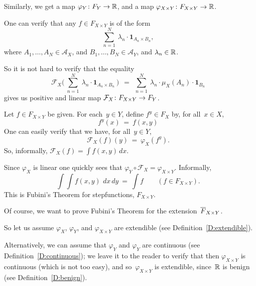 \documentclass[main.tex]{subfiles}
\begin{document}
Similarly, we get
a map $\varphi_Y \colon F_Y \rightarrow \mathbb{R}$,
and a map $\varphi_{X\times Y} \colon F_{X\times Y} \rightarrow \mathbb{R}$.

One can verify that any $f\in F_{X\times Y}$
is of the form
\begin{equation*}
\textstyle{\sum_{n=1}^N} \ \lambda_n \cdot\mathbf{1}_{A_n \times B_n},
\end{equation*}
where $A_1,\dotsc,A_N\in \mathcal{A}_X$,
and $B_1,\dotsc,B_N\in\mathcal{A}_Y$,
and $\lambda_n \in \mathbb{R}$.

So it is not hard to verify that the  equality
\begin{equation*}
\mathcal{F}_X \bigl(\ 
\textstyle{\sum_{n=1}^N} \ \lambda_n \cdot\mathbf{1}_{A_n \times B_n}\ \bigr)
\ \ =\ \ 
\textstyle{\sum_{n=1}^N} \ \lambda_n \cdot \mu_X(A_n) \cdot \mathbf{1}_{B_n}
\end{equation*}
gives us positive and linear map 
$\mathcal{F}_X \colon F_{X\times Y} \rightarrow F_Y$.

Let $f\in F_{X\times Y}$ be given.
For each~$y\in Y$,
define $f^y\in F_X$ by, for all~$x\in X$,
\begin{equation*}
f^y(x) \ =\  f(x,y)
\end{equation*}
One can easily verify that we have, for all~$y\in Y$,
\begin{equation*}
\mathcal{F}_X (f) (y)\ =\ \varphi_X (f^y).
\end{equation*}
So, informally, $\mathcal{F}_{X}(f) = \int f(x,y)\,dx$.

Since $\varphi_X$ is linear
one quickly sees that $\varphi_Y \circ \mathcal{F}_X = \varphi_{X\times Y}$.
Informally,
\begin{equation*}
\int\int f(x,y)\, \,dx \,dy
\ =\ 
\int f
\qquad(f\in F_{X\times Y}).
\end{equation*}
This is Fubini's Theorem for stepfunctions, $F_{X\times Y}$.

Of course, we want to prove
Fubini's Theorem
for the extension~$\overline{F}_{X\times Y}$.

So let us assume
$\varphi_X$, $\varphi_Y$, and $\varphi_{X\times Y}$ are extendible
(see Definition~\ref{D:extendible}).

Alternatively,
we can assume that 
$\varphi_Y$ and $\varphi_Y$
are continuous (see Definition~\ref{D:continuous});
we leave it to the reader to verify that then
 $\varphi_{X\times Y}$ is continuous
(which is not too easy),
and so~$\varphi_{X\times Y}$ is extendible,
since~$\mathbb{R}$ is benign (see Definition~\ref{D:benign}).
\end{document}
